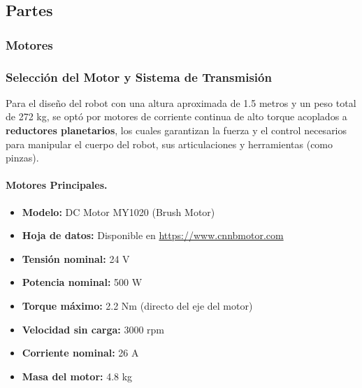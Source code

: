 \subsection{Partes} \label{subsec:partes}
\subsubsection{Motores} \label{subsubsec:motores}
\subsubsection{Selección del Motor y Sistema de Transmisión}

Para el diseño del robot con una altura aproximada de 1.5 metros y un peso total de 272 kg, se optó por motores de corriente continua de alto torque acoplados a \textbf{reductores planetarios}, los cuales garantizan la fuerza y el control necesarios para manipular el cuerpo del robot, sus articulaciones y herramientas (como pinzas).

\paragraph{Motores Principales.}

\begin{itemize}
	\item \textbf{Modelo:} DC Motor MY1020 (Brush Motor)
	\item \textbf{Hoja de datos:} Disponible en \url{https://www.cnnbmotor.com}
	\item \textbf{Tensión nominal:} 24 V
	\item \textbf{Potencia nominal:} 500 W
	\item \textbf{Torque máximo:} 2.2 Nm (directo del eje del motor)
	\item \textbf{Velocidad sin carga:} 3000 rpm
	\item \textbf{Corriente nominal:} 26 A
	\item \textbf{Masa del motor:} 4.8 kg
\end{itemize}

